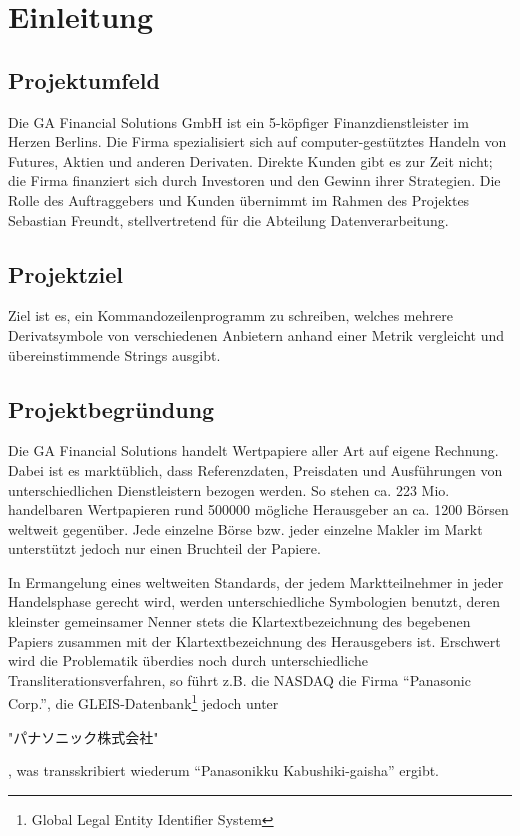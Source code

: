 \section{Einleitung}
\subsection{Projektumfeld}
Die GA Financial Solutions GmbH ist ein 5-köpfiger Finanzdienstleister im
Herzen Berlins. Die Firma spezialisiert sich auf computer-gestütztes Handeln
von Futures, Aktien und anderen Derivaten. Direkte Kunden gibt es zur Zeit
nicht; die Firma finanziert sich durch Investoren und den Gewinn ihrer
Strategien. Die Rolle des Auftraggebers und Kunden übernimmt im Rahmen des
Projektes Sebastian Freundt, stellvertretend für die Abteilung Datenverarbeitung.\par

\subsection{Projektziel}
Ziel ist es, ein Kommandozeilenprogramm zu schreiben, welches mehrere Derivatsymbole 
von verschiedenen Anbietern anhand einer Metrik vergleicht und übereinstimmende 
Strings ausgibt.\par

\subsection{Projektbegründung}
Die GA Financial Solutions handelt Wertpapiere aller Art auf eigene
Rechnung.  Dabei ist es marktüblich, dass Referenzdaten, Preisdaten
und Ausführungen von unterschiedlichen Dienstleistern bezogen werden.
So stehen ca. 223 Mio. handelbaren Wertpapieren rund 500000 mögliche
Herausgeber an ca. 1200 Börsen weltweit gegenüber.  Jede einzelne
Börse bzw. jeder einzelne Makler im Markt unterstützt jedoch nur
einen Bruchteil der Papiere.\par

In Ermangelung eines weltweiten Standards, der jedem Marktteilnehmer in
jeder Handelsphase gerecht wird, werden unterschiedliche Symbologien
benutzt, deren kleinster gemeinsamer Nenner stets die
Klartextbezeichnung des begebenen Papiers zusammen mit der
Klartextbezeichnung des Herausgebers ist.  Erschwert wird die
Problematik überdies noch durch unterschiedliche Transliterationsverfahren,
so führt z.B. die NASDAQ die Firma "`Panasonic Corp."',
die GLEIS-Datenbank\footnote{Global Legal Entity Identifier System} jedoch unter
\begin{CJK}{UTF8}{min}
"パナソニック株式会社"
\end{CJK}%
, was transskribiert wiederum "`Panasonikku Kabushiki-gaisha"' ergibt. \par


